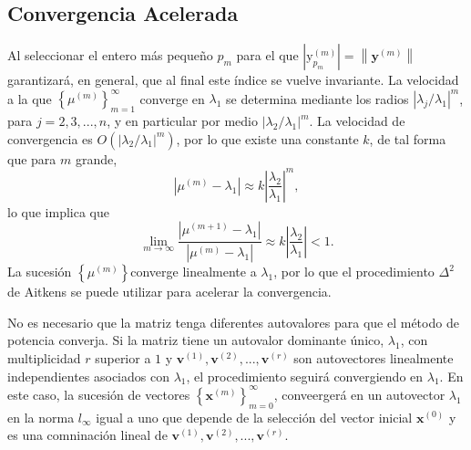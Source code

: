 \documentclass[12pt, a4paper]{article}
\numberwithin{subsection}{section} %
\begin{document}
        
        \subsection{\textnormal{Convergencia Acelerada}}
        
        Al seleccionar el entero más pequeño $p_{m}$ para el que $\left| \text{y}_{p_{m}}^{\left( m \right)} \right| = \left\| \textbf{y}^{\left( m \right)} \right\|$ garantizará, en general, que al final este índice se vuelve invariante. La velocidad a la que $\left\{ \mu^{\left( m \right)} \right\}_{m=1}^{\infty }$ converge en $\lambda_{1}$ se determina mediante los radios $\left| \lambda_{j} / \lambda_{1} \right|^{m}$, para $j = 2, 3, ..., n$, y en particular por medio $\left| \lambda_{2} / \lambda_{1} \right|^{m}$. La velocidad de convergencia es $O\left( \left| \lambda_{2} / \lambda_{1} \right|^{m} \right)$, por lo que existe una constante $k$, de tal forma que para $m$ grande,
        \begin{equation*}
        \left| \mu^{\left( m \right)} - \lambda_{1} \right| \approx k\left| \frac{\lambda_{2}}{\lambda_{1}} \right|^{m},
        \end{equation*}
        lo que implica que
        \begin{equation*}
        \lim_{m \to \infty} \frac{\left| \mu^{\left( m + 1 \right)} - \lambda_{1} \right|}{\left| \mu^{\left( m \right)} - \lambda_{1} \right|}  \approx k\left| \frac{\lambda_{2}}{\lambda_{1}} \right| < 1.
        \end{equation*}
        La sucesión $\left\{ \mu^{\left( m \right)} \right\}$converge linealmente a $\lambda_{1}$, por lo que el procedimiento $\Delta ^{2}$ de Aitkens se puede utilizar para acelerar la convergencia.
        
        No es necesario que la matriz tenga diferentes autovalores para que el método de potencia converja. Si la matriz tiene un autovalor dominante único, $\lambda_{1}$, con multiplicidad $r$ superior a $1$ y $\textbf{v}^{\left( 1 \right)}, \textbf{v}^{\left( 2 \right)}, ..., \textbf{v}^{\left( r \right)}$ son autovectores linealmente independientes asociados con $\lambda_{1}$, el procedimiento seguirá convergiendo en $\lambda_{1}$. En este caso, la sucesión de vectores $\left\{ \textbf{x}^{\left( m \right)} \right\}_{m=0}^{\infty}$, conveergerá en un autovector $\lambda_{1}$ en la norma $l_{\infty}$ igual a uno que depende de la selección del vector inicial $\textbf{x}^{\left( 0 \right)}$ y es una comninación lineal de $\textbf{v}^{\left( 1 \right)}, \textbf{v}^{\left( 2 \right)}, ..., \textbf{v}^{\left( r \right)}$.
        
\end{document}
